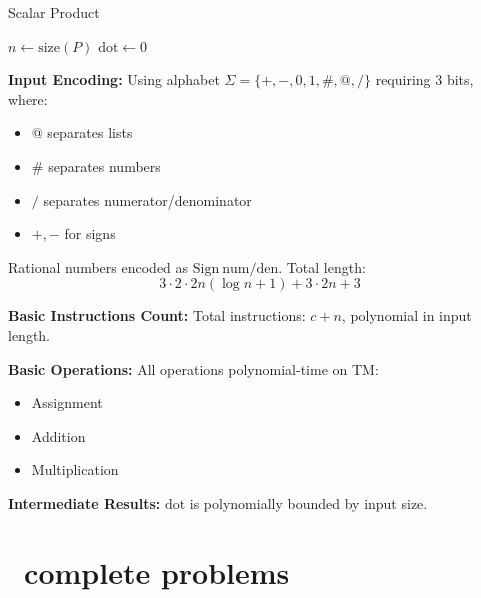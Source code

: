 \begin{solution}
	\begin{algorithm}
		\caption{Scalar Product}\label{alg:scalar}
		$n \gets \text{size}(P)$\;
		$\text{dot} \gets 0$\;
		\;
	\end{algorithm}

	\textbf{Input Encoding:}
	Using alphabet $\Sigma = \{+,-,0,1,\#,@,/\}$ requiring 3 bits, where:
	\begin{itemize}
		\item $@$ separates lists
		\item $\#$ separates numbers
		\item $/$ separates numerator/denominator
		\item $+,-$ for signs
	\end{itemize}
	Rational numbers encoded as $\text{Sign}\ \text{num}/\text{den}$. Total length:
	\[3 \cdot 2 \cdot 2n(\log n + 1) + 3 \cdot 2n + 3\]

	\textbf{Basic Instructions Count:}
	Total instructions: $c + n$, polynomial in input length.

	\textbf{Basic Operations:}
	All operations polynomial-time on TM:
	\begin{itemize}
		\item Assignment
		\item Addition
		\item Multiplication
	\end{itemize}

	\textbf{Intermediate Results:}
	$\text{dot}$ is polynomially bounded by input size.
\end{solution}



\section{\NP~complete problems}

